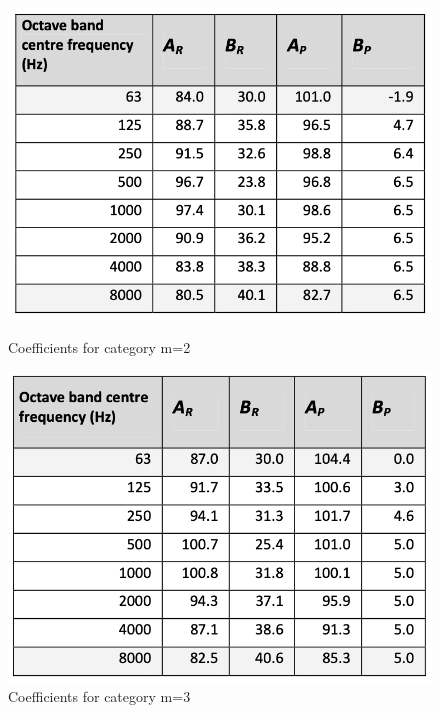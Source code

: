 \documentclass{article}
\begin{document}
\begin{figure}[H]
    \begin{minipage}[c]{.46\linewidth}
        \centering
        \includegraphics[width=1.1\textwidth]{CNOSSOS/Coefficients for category m=2.png}
        \caption{Coefficients for category m=2}
    \end{minipage}
    \hfill%
    \begin{minipage}[c]{.46\linewidth}
        \centering
        \includegraphics[width=1.1\textwidth]{CNOSSOS/Coefficients for category m=3.png}
        \caption{Coefficients for category m=3}
    \end{minipage}
\end{figure}
\end{document}
